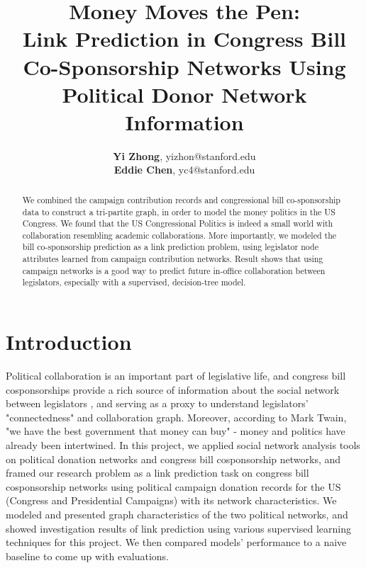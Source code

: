 \documentclass[12pt,twocolumn]{article}
\begin{document}
%
\title{Money Moves the Pen: \\ Link Prediction in Congress Bill Co-Sponsorship Networks Using Political Donor Network Information}


\author{\textbf{Yi Zhong}, yizhon@stanford.edu \\\textbf{Eddie Chen}, yc4@stanford.edu}

\maketitle

\begin{abstract}
We combined the campaign contribution records and congressional bill co-sponsorship data to construct a tri-partite graph, in order to model the money politics in the US Congress. We found that the US Congressional Politics is indeed a small world with collaboration resembling academic collaborations. More importantly, we modeled the bill co-sponsorship prediction as a link prediction problem, using legislator node attributes learned from campaign contribution networks. Result shows that using campaign networks is a good way to predict future in-office collaboration between legislators, especially with a supervised, decision-tree model. 
\end{abstract}
\section{Introduction}
Political collaboration is an important part of legislative life, and congress bill cosponsorships provide a rich source of information about the social network between legislators \cite{fowler2006connecting}, and serving as a proxy to understand legislators' "connectedness" and collaboration graph. Moreover, according to Mark Twain, "we have the best government that money can buy" - money and politics have already been intertwined. In this project, we applied social network analysis tools on political donation networks and congress bill cosponsorship networks, and framed our research problem as a link prediction task on congress bill cosponsorship networks using political campaign donation records for the US (Congress and Presidential Campaigns) with its network characteristics. We modeled and presented graph characteristics of the two political networks, and showed investigation results of link prediction using various supervised learning techniques for this project. We then compared models' performance to a naive baseline to come up with evaluations. 
\end{document}
